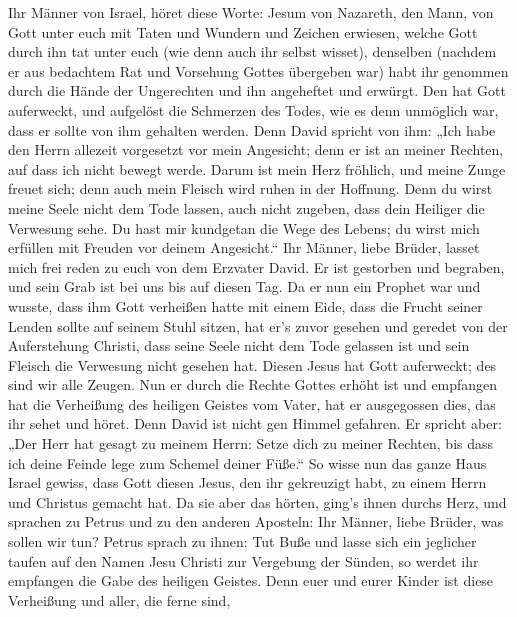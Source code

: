  Ihr Männer von Israel, höret diese Worte: Jesum von
Nazareth, den Mann, von Gott unter euch mit Taten und Wundern und
Zeichen erwiesen, welche Gott durch ihn tat unter euch (wie denn auch
ihr selbst wisset),  denselben (nachdem er aus bedachtem
Rat und Vorsehung Gottes übergeben war) habt ihr genommen durch die
Hände der Ungerechten und ihn angeheftet und erwürgt. 
Den hat Gott auferweckt, und aufgelöst die Schmerzen des Todes, wie es
denn unmöglich war, dass er sollte von ihm gehalten werden.
 Denn David spricht von ihm: „Ich habe den Herrn allezeit
vorgesetzt vor mein Angesicht; denn er ist an meiner Rechten, auf dass
ich nicht bewegt werde.  Darum ist mein Herz fröhlich,
und meine Zunge freuet sich; denn auch mein Fleisch wird ruhen in der
Hoffnung.  Denn du wirst meine Seele nicht dem Tode
lassen, auch nicht zugeben, dass dein Heiliger die Verwesung sehe.
 Du hast mir kundgetan die Wege des Lebens; du wirst mich
erfüllen mit Freuden vor deinem Angesicht.``  Ihr Männer,
liebe Brüder, lasset mich frei reden zu euch von dem Erzvater David. Er
ist gestorben und begraben, und sein Grab ist bei uns bis auf diesen
Tag.  Da er nun ein Prophet war und wusste, dass ihm Gott
verheißen hatte mit einem Eide, dass die Frucht seiner Lenden sollte auf
seinem Stuhl sitzen,  hat er's zuvor gesehen und geredet
von der Auferstehung Christi, dass seine Seele nicht dem Tode gelassen
ist und sein Fleisch die Verwesung nicht gesehen hat. 
Diesen Jesus hat Gott auferweckt; des sind wir alle Zeugen.
 Nun er durch die Rechte Gottes erhöht ist und empfangen
hat die Verheißung des heiligen Geistes vom Vater, hat er ausgegossen
dies, das ihr sehet und höret.  Denn David ist nicht gen
Himmel gefahren. Er spricht aber: „Der Herr hat gesagt zu meinem Herrn:
Setze dich zu meiner Rechten,  bis dass ich deine Feinde
lege zum Schemel deiner Füße.``  So wisse nun das ganze
Haus Israel gewiss, dass Gott diesen Jesus, den ihr gekreuzigt habt, zu
einem Herrn und Christus gemacht hat.  Da sie aber das
hörten, ging's ihnen durchs Herz, und sprachen zu Petrus und zu den
anderen Aposteln: Ihr Männer, liebe Brüder, was sollen wir tun?
 Petrus sprach zu ihnen: Tut Buße und lasse sich ein
jeglicher taufen auf den Namen Jesu Christi zur Vergebung der Sünden, so
werdet ihr empfangen die Gabe des heiligen Geistes.  Denn
euer und eurer Kinder ist diese Verheißung und aller, die ferne sind,
